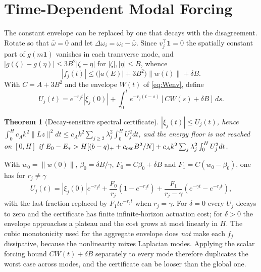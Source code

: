 \documentclass[11pt,notitlepage]{report}
\newtheorem{theorem}{Theorem}[chapter]
\theoremstyle{definition}
\theoremstyle{remark}
\newcommand{\one}{\mathbf 1}
\begin{document}
\section{Time-Dependent Modal Forcing}
The constant envelope can be replaced by one that decays with the disagreement. Rotate so that $\bar\omega=0$ and let $\Delta\omega_i=\omega_i-\bar\omega$. Since $v_j^\top\one=0$ the spatially constant part of $g(m\one)$ vanishes in each transverse mode, and $|g(\zeta)-g(\eta)|\le3B^2|\zeta-\eta|$ for $|\zeta|,|\eta|\le B$, whence
\begin{equation}\label{eq:forcing}
|f_j(t)|\le\bigl(|a(E)|+3B^2\bigr)\|w(t)\|+\delta B.
\end{equation}
With $C=A+3B^2$ and the envelope $W(t)$ of \eqref{eq:Wenv}, define
\[
U_j(t)=e^{-r_jt}|\xi_j(0)|+\int_0^te^{-r_j(t-s)}[CW(s)+\delta B]\,ds.
\]
\begin{theorem}[Decay-sensitive spectral certificate]\label{th:modalforcing}
$|\xi_j(t)|\le U_j(t)$, hence $\int_0^Hc_Ak^2\|Lz\|^2dt\le c_Ak^2\sum_{j\ge2}\lambda_j^2\int_0^HU_j^2dt$, and the energy floor is not reached on $[0,H]$ if $E_0-E_*>H[(b-q)_++c_{\rm osc}B^2/N]+c_Ak^2\sum_j\lambda_j^2\int_0^HU_j^2dt$.
\end{theorem}
With $w_0=\|w(0)\|$, $\beta_0=\delta B/\gamma$, $F_0=C\beta_0+\delta B$ and $F_1=C(w_0-\beta_0)$, one has for $r_j\ne\gamma$
\[
U_j(t)=|\xi_j(0)|e^{-r_jt}+\frac{F_0}{r_j}(1-e^{-r_jt})+\frac{F_1}{r_j-\gamma}(e^{-\gamma t}-e^{-r_jt}),
\]
with the last fraction replaced by $F_1te^{-r_jt}$ when $r_j=\gamma$. For $\delta=0$ every $U_j$ decays to zero and the certificate has finite infinite-horizon actuation cost; for $\delta>0$ the envelope approaches a plateau and the cost grows at most linearly in $H$. The cubic monotonicity used for the aggregate envelope does \emph{not} make each $f_j$ dissipative, because the nonlinearity mixes Laplacian modes. Applying the scalar forcing bound $CW(t)+\delta B$ separately to every mode therefore duplicates the worst case across modes, and the certificate can be looser than the global one.
\end{document}
